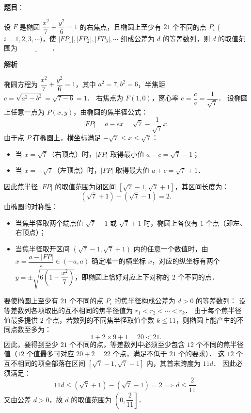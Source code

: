\begin{answer}

\textbf{题目}：

设 $F$ 是椭圆 $\dfrac{x^2}{7} + \dfrac{y^2}{6} = 1$ 的右焦点，且椭圆上至少有 $21$ 个不同的点 $P_i$ ($i = 1, 2, 3, \cdots$)，使 $|FP_1|, |FP_2|, |FP_3|, \cdots$ 组成公差为 $d$ 的等差数列，则 $d$ 的取值范围为 $\underline{\hspace{2cm}}$．

\textbf{解析}

椭圆方程为 $\dfrac{x^2}{7} + \dfrac{y^2}{6} = 1$，其中 $a^2 = 7, b^2 = 6$，半焦距 $c = \sqrt{a^2 - b^2} = \sqrt{7 - 6} = 1$．
右焦点为 $F(1, 0)$，离心率 $e = \dfrac{c}{a} = \dfrac{1}{\sqrt{7}}$．
设椭圆上任意一点为 $P(x, y)$，由椭圆的焦半径公式：
\nopagebreak[4]
\[
|FP| = a - ex = \sqrt{7} - \frac{1}{\sqrt{7}}x.
\]
由于点 $P$ 在椭圆上，横坐标满足 $-\sqrt{7} \leqslant x \leqslant \sqrt{7}$：
\begin{itemize}
\item 当 $x = \sqrt{7}$（右顶点）时，$|FP|$ 取得最小值 $a - c = \sqrt{7} - 1$；
\item 当 $x = -\sqrt{7}$（左顶点）时，$|FP|$ 取得最大值 $a + c = \sqrt{7} + 1$．
\end{itemize}
因此焦半径 $|FP|$ 的取值范围为闭区间 $[\sqrt{7} - 1, \sqrt{7} + 1]$，其区间长度为：
\nopagebreak[4]
\[
(\sqrt{7} + 1) - (\sqrt{7} - 1) = 2.
\]
由椭圆的对称性：
\begin{itemize}
\item 当焦半径取两个端点值 $\sqrt{7} - 1$ 或 $\sqrt{7} + 1$ 时，椭圆上各仅有 $1$ 个点（即左、右顶点）；
\item 当焦半径取开区间 $(\sqrt{7} - 1, \sqrt{7} + 1)$ 内的任意一个数值时，由 $x = \dfrac{a - |FP|}{e} \in (-a, a)$ 确定唯一的横坐标 $x$，对应的纵坐标有两个 $y = \pm \sqrt{6\left(1 - \dfrac{x^2}{7}\right)}$，即椭圆上恰好对应上下对称的 $2$ 个不同的点．
\end{itemize}
要使椭圆上至少有 $21$ 个不同的点 $P_i$ 的焦半径构成公差为 $d > 0$ 的等差数列：
设等差数列各项取出的互不相同的焦半径值为 $r_1 < r_2 < \cdots < r_k$．
由于每个焦半径值最多提供 $2$ 个点，若数列的不同焦半径取值个数 $k \leqslant 11$，则椭圆上能产生的不同点数至多为：
\nopagebreak[4]
\[
1 + 2 \times 9 + 1 = 20 < 21.
\]
因此，要得到至少 $21$ 个不同的点，等差数列中必须至少包含 $12$ 个不同的焦半径值（$12$ 个值最多可对应 $20 + 2 = 22$ 个点，满足不低于 $21$ 个的要求）．
这 $12$ 个互不相同的项全部落在区间 $[\sqrt{7} - 1, \sqrt{7} + 1]$ 内，其首末跨度为 $11d$．
因此必须满足：
\nopagebreak[4]
\[
11d \leqslant (\sqrt{7} + 1) - (\sqrt{7} - 1) = 2 \implies d \leqslant \frac{2}{11}.
\]
又由公差 $d > 0$，故 $d$ 的取值范围为 $\left(0, \dfrac{2}{11}\right]$．

\gkanswer{答案：$\left(0, \dfrac{2}{11}\right]$}

\end{answer}
